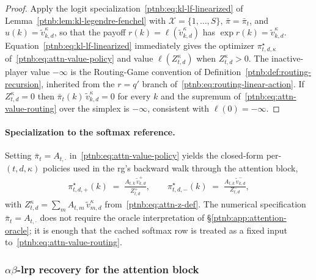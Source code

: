 \begin{proof}
Apply the logit specialization~\eqref{ptnb:eq:kl-lf-linearized} of Lemma~\ref{ptnb:lem:kl-legendre-fenchel}
with $\mathcal{X} = \{1,\dots,S\}$, $\bar\pi = \bar\pi_t$, and $u(k) = \tilde{v}_{k,d}^\kappa$, so
that the payoff $r(k) = \ell(\tilde{v}_{k,d}^\kappa)$ has $\exp r(k) = \tilde{v}_{k,d}^\kappa$.
Equation~\eqref{ptnb:eq:kl-lf-linearized} immediately gives the optimizer $\pi_{t,d,\kappa}^\star$
of~\eqref{ptnb:eq:attn-value-policy} and value $\ell(Z_{t,d}^\kappa)$ when $Z_{t,d}^\kappa > 0$. The
inactive-player value $-\infty$ is the Routing-Game convention of
Definition~\ref{ptnb:def:routing-recursion}, inherited from the $r = q'$ branch
of~\eqref{ptnb:eq:routing-linear-action}. If $Z_{t,d}^\kappa = 0$ then
$\bar\pi_t(k)\,\tilde{v}_{k,d}^\kappa = 0$ for every $k$ and the supremum
of~\eqref{ptnb:eq:attn-value-routing} over the simplex is $-\infty$, consistent with $\ell(0) =
    -\infty$.
\end{proof}

\paragraph{Specialization to the softmax reference.}
Setting $\bar\pi_t = A_{t,\cdot}$ in~\eqref{ptnb:eq:attn-value-policy} yields the closed-form
per-$(t,d,\kappa)$ policies used in the \ac{rg}'s backward walk through the attention block,
\begin{align}\label{ptnb:eq:attn-branch-policy}
    \pi_{t,d,+}^\star(k) \;=\; \frac{A_{t,k}\, \tilde{v}_{k,d}^+}{Z_{t,d}^+},
    \qquad
    \pi_{t,d,-}^\star(k) \;=\; \frac{A_{t,k}\, \tilde{v}_{k,d}^-}{Z_{t,d}^-},
\end{align}
with $Z_{t,d}^\kappa = \sum_m A_{t,m}\, \tilde{v}_{m,d}^\kappa$ from~\eqref{ptnb:eq:attn-z-def}. The
numerical specification $\bar\pi_t = A_{t,\cdot}$ does not require the oracle interpretation of
\S\ref{ptnb:app:attention-oracle}; it is enough that the cached softmax row is treated as a fixed input
to~\eqref{ptnb:eq:attn-value-routing}.

\subsubsection{\texorpdfstring{$\alpha\beta$-\ac{lrp}}{alpha-beta-LRP} recovery for the attention block}\label{ptnb:app:attention-recovery}

